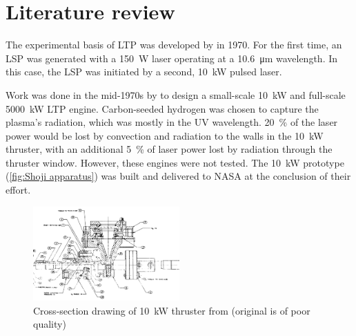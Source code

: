     \section{Literature review}


        The experimental basis of LTP was developed by \textcite{generalovContinuousOpticalDischarge1970} in 1970. For the first time, an LSP was generated with a \qty{150}{W}  laser operating at a \qty{10.6}{μm} wavelength. In this case, the LSP was initiated by a second, \qty{10}{kW} pulsed  laser.
        

        Work was done in the mid-1970s by \textcite{shojiLaserheatedRocketThruster1977,shojiPerformanceHeatTransfer1976a} to design a small-scale \qty{10}{kW} and full-scale \qty{5000}{kW} LTP engine. Carbon-seeded hydrogen was chosen to capture the plasma's radiation, which was mostly in the UV wavelength. \qty{20}{\%} of the laser power would be lost by convection and radiation to the walls in the \qty{10}{kW} thruster, with an additional \qty{5}{\%} of laser power lost by radiation through the thruster window. However, these engines were not tested. The \qty{10}{kW} prototype (\autoref{fig:Shoji apparatus}) was built and delivered to NASA at the conclusion of their effort.
        \begin{figure}[!ht]
            \centering
            \includegraphics[width=0.5\textwidth]{assets/2 background/Shoji cross-section.png}
            \caption{Cross-section drawing of \qty{10}{kW} thruster from \textcite{shojiLaserheatedRocketThruster1977} (original is of poor quality)}
            \label{fig:Shoji cross-section}
        \end{figure}


